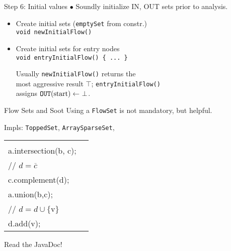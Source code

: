 \begin{slide}{Step 6: Initial values}
\vspace*{-0.1in}
$\bullet$ Soundly initialize IN, OUT sets prior to analysis.

\begin{itemize}

\item Create initial sets ({\tt emptySet} from constr.)\\
{\tt void newInitialFlow()}\\

\item Create initial sets for entry nodes\\
{\tt void entryInitialFlow() \{ ... \} }

\vspace*{0.09in}

Usually {\tt newInitialFlow()} returns the \\ \quad most aggressive result
$\top$; {\tt entryInitialFlow()} \\ \quad assigns
 $\mbox{\tt OUT}(\mbox{start}) 
\leftarrow\ \perp$.
\end{itemize}
\end{slide}

\begin{slide}{Flow Sets and Soot}
\vspace*{-0.1in}
Using a {\tt FlowSet} is not mandatory, but helpful.

\quad

Impls: {\tt ToppedSet}, {\tt ArraySparseSet}, \\
\qquad {}

\quad

\begin{tabular}{ll}
\begin{minipage}{0.5\textwidth}
{\small \tt 
// $c = a \cap b$ \\
a.intersection(b, c); \\

// $d = \overline{c}$\\
c.complement(d);
}
\end{minipage} &
\begin{minipage}{0.3\textwidth}
{\small \tt
// $c = a \cup b$ \\
a.union(b,c);\\

// $d = d \cup \{ \mbox{v} \}$\\
d.add(v);
}
\end{minipage}

\end{tabular}

\quad

\begin{center}
Read the JavaDoc!
\end{center}
\end{slide}

